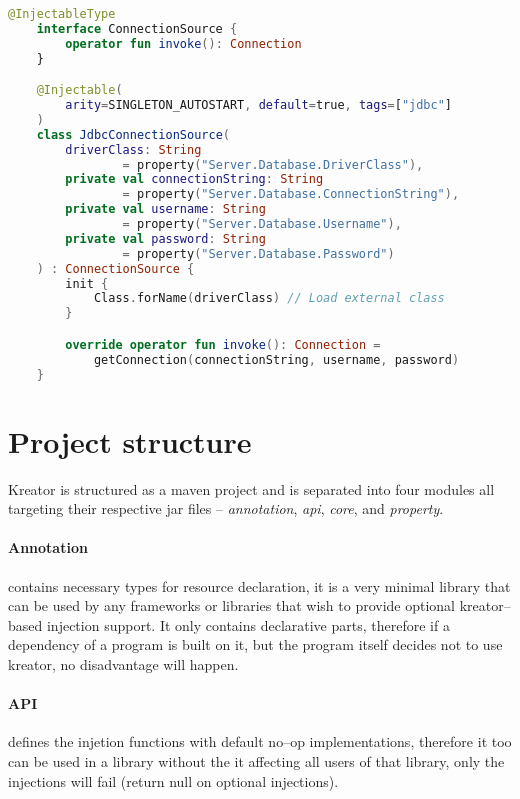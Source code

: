 		\begin{center}
			\begin{minipage}{14cm}
		\begin{lstlisting}[language=Kotlin, title={\emph{Example usage} -- \code{dbConnection.kt}}]
	@InjectableType
	interface ConnectionSource {
		operator fun invoke(): Connection
	}

	@Injectable(
		arity=SINGLETON_AUTOSTART, default=true, tags=["jdbc"]
	)
	class JdbcConnectionSource(
		driverClass: String
				= property("Server.Database.DriverClass"),
        private val connectionString: String
        		= property("Server.Database.ConnectionString"),
        private val username: String
        		= property("Server.Database.Username"),
        private val password: String
        		= property("Server.Database.Password")
	) : ConnectionSource {
		init {
	        Class.forName(driverClass) // Load external class
	    }

	    override operator fun invoke(): Connection =
	    	getConnection(connectionString, username, password)
	}
		\end{lstlisting}
			\end{minipage}
		\end{center}
	
	\section{Project structure}
	
	Kreator is structured as a maven project and is separated into four modules all targeting their respective jar files -- \emph{annotation}, \emph{api}, \emph{core}, and \emph{property}.
	
	\paragraph{Annotation} contains necessary types for resource declaration, it is a very minimal library that can be used by any frameworks or libraries that wish to provide optional kreator--based injection support. It only contains declarative parts, therefore if a dependency of a program is built on it, but the program itself decides not to use kreator, no disadvantage will happen.
	
	\paragraph{API} defines the injetion functions with default no--op implementations, therefore it too can be used in a library without the it affecting all users of that library, only the injections will fail (return null on optional injections).
	
